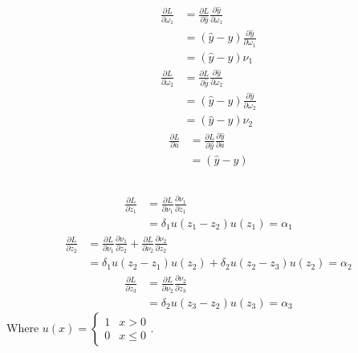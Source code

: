 \documentclass[11pt]{scrartcl} %
\begin{document}
\subsection{} %
\begin{equation}
\begin{aligned}
	\frac{\partial L}{\partial \omega_1} &= \frac{\partial L}{\partial \hat{y}} \frac{\partial \hat{y}}{\partial \omega_1} \\
	&= (\hat{y} - y) \frac{\partial \hat{y}}{\partial \omega_1} \\
	&= (\hat{y} - y) \nu_1 
\end{aligned}
\end{equation}
\begin{equation}
\begin{aligned}
	\frac{\partial L}{\partial \omega_2} &= \frac{\partial L}{\partial \hat{y}} \frac{\partial \hat{y}}{\partial \omega_2} \\
	&= (\hat{y} - y) \frac{\partial \hat{y}}{\partial \omega_2} \\
	&= (\hat{y} - y) \nu_2
\end{aligned}
\end{equation}
\begin{equation}
	\begin{aligned}
		\frac{\partial L}{\partial a} &= \frac{\partial L}{\partial \hat{y}} \frac{\partial \hat{y}}{\partial a} \\
		&= (\hat{y} - y)
	\end{aligned}
\end{equation}
\subsection{} %
\begin{equation}
	\begin{aligned}
	\frac{\partial L}{\partial z_1} &= \frac{\partial L}{\partial \nu_1} \frac{\partial \nu_1}{\partial z_1} \\
	&= \delta_1 u(z_1 - z_2) u(z_1) = \alpha_1
	\end{aligned}
\end{equation}
\begin{equation}
	\begin{aligned}
	\frac{\partial L}{\partial z_2} &= \frac{\partial L}{\partial \nu_1} \frac{\partial \nu_1}{\partial z_2} + \frac{\partial L}{\partial \nu_2} \frac{\partial \nu_2}{\partial z_2} \\
	&= \delta_1 u(z_2 - z_1) u(z_2) + \delta_2 u(z_2 - z_3) u(z_2) = \alpha_2
	\end{aligned}
\end{equation}
\begin{equation}
	\begin{aligned}
	\frac{\partial L}{\partial z_3} &= \frac{\partial L}{\partial \nu_2} \frac{\partial \nu_2}{\partial z_3} \\
	&= \delta_2 u(z_3 - z_2) u(z_3) = \alpha_3
	\end{aligned}
\end{equation}
Where $ u(x) = \begin{cases} 1 & x > 0 \\ 0 & x \leq 0 \end{cases} $.
\end{document}
